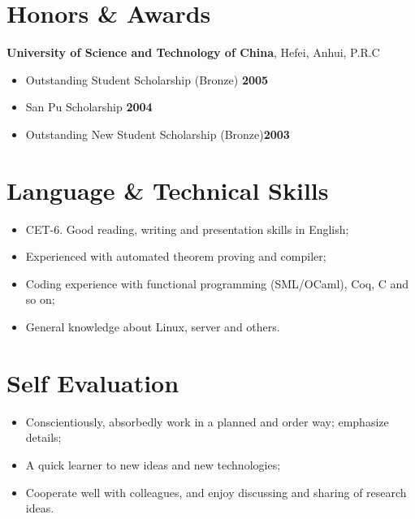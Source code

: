 \documentclass[margin]{res}
\newcommand{\ustc}{University of Science and Technology of China}
\newcommand{\hefei}{Hefei, Anhui, P.R.C}
\begin{document}
\section{Honors \& \quad Awards} 
\textbf{\ustc}, \hefei
\vspace{2mm}
\begin{itemize}
\item Outstanding Student Scholarship (Bronze) \hfill {\bf 2005}
\item San Pu Scholarship \hfill {\bf 2004}
\item Outstanding New Student Scholarship (Bronze)\hfill {\bf 2003}
\end{itemize}

\section{Language \& \quad Technical Skills}
\begin{itemize}
\item CET-6. Good reading, writing and presentation skills in English;
\item Experienced with automated theorem proving and compiler;
\item Coding experience with functional programming (SML/OCaml), Coq, C and so on;
\item General knowledge about Linux, server and others.
\end{itemize}

\section{Self Evaluation}
\begin{itemize}

\item Conscientiously, absorbedly work in a planned and order way; emphasize details;
\item A quick learner to new ideas and new technologies;
\item Cooperate well with colleagues, and enjoy discussing and sharing of research ideas.

\end{itemize}
\end{document}

